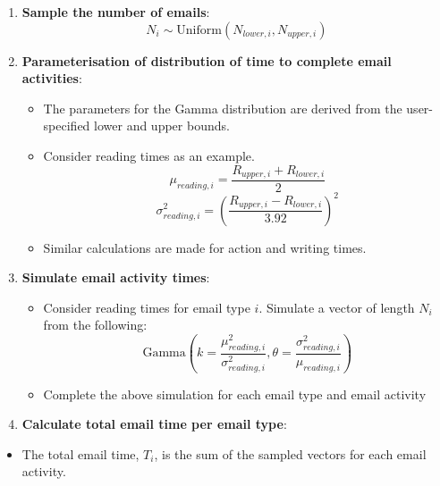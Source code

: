\documentclass[
  reportpaper,
  DIV=11,
  numbers=noendperiod]{scrartcl}
\providecommand{\tightlist}{%
  \setlength{\itemsep}{0pt}\setlength{\parskip}{0pt}}\usepackage{longtable,booktabs,array}
\begin{document}
\begin{enumerate}
\def\labelenumi{\arabic{enumi}.}
\item
  \textbf{Sample the number of emails}:
  \[ N_i \sim \text{Uniform}(N_{lower,i}, N_{upper,i}) \]
\item
  \textbf{Parameterisation of distribution of time to complete email
  activities}:

  \begin{itemize}
  \tightlist
  \item
    The parameters for the Gamma distribution are derived from the
    user-specified lower and upper bounds.
  \item
    Consider reading times as an example.
    \[ \mu_{reading,i} = \frac{R_{upper,i} + R_{lower,i}}{2} \]
    \[ \sigma_{reading,i}^2 = \left(\frac{R_{upper,i} - R_{lower,i}}{3.92}\right)^2 \]
  \item
    Similar calculations are made for action and writing times.
  \end{itemize}
\item
  \textbf{Simulate email activity times}:

  \begin{itemize}
  \tightlist
  \item
    Consider reading times for email type \(i\). Simulate a vector of
    length \(N_i\) from the following:
    \[\text{Gamma}(k = \frac{\mu_{reading,i}^2}{\sigma_{reading,i}^2}, \theta = \frac{\sigma_{reading,i}^2}{\mu_{reading,i}}) \]
  \item
    Complete the above simulation for each email type and email activity
  \end{itemize}
\item
  \textbf{Calculate total email time per email type}:
\end{enumerate}

\begin{itemize}
\tightlist
\item
  The total email time, \(T_i\), is the sum of the sampled vectors for
  each email activity.
\end{itemize}
\end{document}
